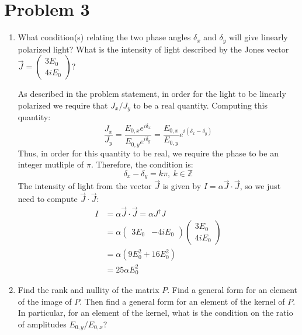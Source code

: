 \documentclass[10pt]{article}
\begin{document}
	\pagebreak
	\section*{Problem 3}
	\begin{enumerate}[label=\alph*)]
		\item What condition(s) relating the two phase angles $\delta_x$ and $\delta_y$ will give linearly 
			polarized light? What is the intensity of light described by the Jones vector 
			$\vec J = \begin{pmatrix} 3E_0\\4iE_0 \end{pmatrix}$?

			\begin{solution}
				As described in the problem statement, in order for the light to be linearly polarized we 
				require that $J_x/J_y$ to be a real quantity. Computing this quantity:
				\[
					\frac{J_x}{J_y} = \frac{E_{0, x}e^{i \delta_x}}{E_{0, y}e^{i \delta_y}} = \frac{E_{0, x}}{E_{0, y}} 
					e^{i(\delta_x - \delta_y)}
				\] 
				Thus, in order for this quantity to be real, we require the phase to be an integer mutliple of 
				$\pi$. Therefore, the condition is:
				\[
				\delta_x - \delta_y = k\pi, \ k \in \mathbb Z
				\] 
				The intensity of light from the vector $\vec J$ is given by $I = \alpha \vec J \cdot \vec J$, so 
				we just need to compute $\vec J \cdot \vec J$:
				\begin{align*}
					I &= \alpha \vec J \cdot \vec J = \alpha J^\dagger J\\
												   &= \alpha \begin{pmatrix} 3E_0 & -4iE_0 \end{pmatrix}
												   \begin{pmatrix} 3E_0\\4iE_0 \end{pmatrix}  \\
												   &= \alpha(9E_0^2 + 16E_0^2)\\
												   &= 25 \alpha E_0^2 
				\end{align*}
			\end{solution}
		\item Find the rank and nullity of the matrix $P$. Find a general form for an element of the image of 
			$P$. Then find a general form for an element of the kernel of $P$. In particular, for an element
			of the kernel, what is the condition on the ratio of amplitudes $E_{0, y} / E_{0, x}$?


\end{enumerate}
\end{document}
